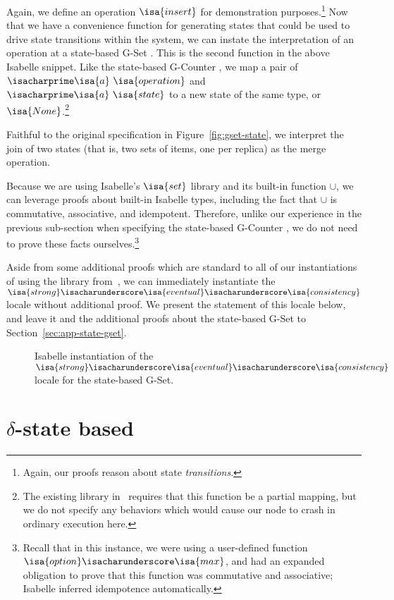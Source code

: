 Again, we define an operation $\isa{insert}$ for demonstration
purposes.\footnote{Again, our proofs reason about state \emph{transitions}.} Now
that we have a convenience function for generating states that could be used to
drive state transitions within the system, we can instate the interpretation of
an operation at a state-based G-Set \CRDT. This is the second function in the
above Isabelle snippet. Like the state-based G-Counter \CRDT, we map a pair of
$\isacharprime\isa{a}~\isa{operation}$ and $\isacharprime\isa{a}~\isa{state}$ to
a new state of the same type, or $\isa{None}$.\footnote{The existing library
in~\citep{gomes17} requires that this function be a partial mapping, but we do
not specify any behaviors which would cause our node to crash in ordinary
execution here.}

Faithful to the original specification in Figure~\ref{fig:gset-state}, we
interpret the join of two states (that is, two sets of items, one per replica)
as the merge operation.

Because we are using Isabelle's $\isa{set}$ library and its built-in function
$\cup$, we can leverage proofs about built-in Isabelle types, including the fact
that $\cup$ is commutative, associative, and idempotent. Therefore, unlike our
experience in the previous sub-section when specifying the state-based G-Counter
\CRDT, we do not need to prove these facts ourselves.\footnote{Recall that in
this instance, we were using a user-defined function
$\isa{option}\isacharunderscore\isa{max}$, and had an expanded obligation to
prove that this function was commutative and associative; Isabelle inferred
idempotence automatically.}

Aside from some additional proofs which are standard to all of our
instantiations of \CRDTs using the library from~\citep{gomes17}, we can
immediately instantiate the
$\isa{strong}\isacharunderscore\isa{eventual}\isacharunderscore\isa{consistency}$
locale without additional proof. We present the statement of this locale below,
and leave it and the additional proofs about the state-based G-Set to
Section~\ref{sec:app-state-gset}.

\begin{figure}[H]
  
  \caption{Isabelle instantiation of the
    $\isa{strong}\isacharunderscore\isa{eventual}\isacharunderscore\isa{consistency}$
    locale for the state-based G-Set.}
\end{figure}

\section{$\delta$-state based \CRDTs}
\label{sec:isabelle-delta-crdts}

